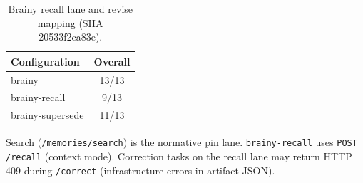 \begin{table}[h]
\centering
\caption{Brainy recall lane and revise mapping (SHA 20533f2ca83e).}
\begin{tabular}{lc}
\toprule
Configuration & Overall \\
\midrule
brainy & 13/13 \\
brainy-recall & 9/13 \\
brainy-supersede & 11/13 \\
\bottomrule
\end{tabular}
\end{table}
Search (\texttt{/memories/search}) is the normative pin lane.
\texttt{brainy-recall} uses \texttt{POST /recall} (context mode).
Correction tasks on the recall lane may return HTTP 409 during \texttt{/correct}
(infrastructure errors in artifact JSON).
